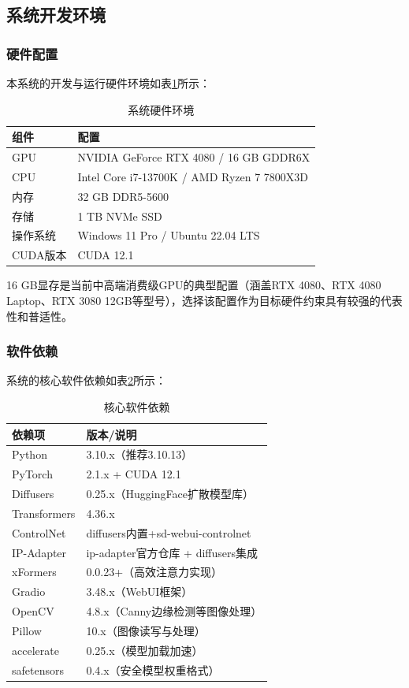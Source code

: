 \documentclass[12pt,a4paper]{ctexart}
\begin{document}
\subsection{系统开发环境}

\subsubsection{硬件配置}

本系统的开发与运行硬件环境如表\ref{tab:hardware}所示：

\begin{table}[H]
\centering
\caption{系统硬件环境}
\label{tab:hardware}
\begin{tabular}{p{4cm} p{8cm}}
\toprule
\textbf{组件} & \textbf{配置} \\
\midrule
GPU & NVIDIA GeForce RTX 4080 / 16 GB GDDR6X \\
CPU & Intel Core i7-13700K / AMD Ryzen 7 7800X3D \\
内存 & 32 GB DDR5-5600 \\
存储 & 1 TB NVMe SSD \\
操作系统 & Windows 11 Pro / Ubuntu 22.04 LTS \\
CUDA版本 & CUDA 12.1 \\
\bottomrule
\end{tabular}
\end{table}

16 GB显存是当前中高端消费级GPU的典型配置（涵盖RTX 4080、RTX 4080 Laptop、RTX 3080 12GB等型号），选择该配置作为目标硬件约束具有较强的代表性和普适性。

\subsubsection{软件依赖}

系统的核心软件依赖如表\ref{tab:software}所示：

\begin{table}[H]
\centering
\caption{核心软件依赖}
\label{tab:software}
\begin{tabular}{p{5cm} p{7cm}}
\toprule
\textbf{依赖项} & \textbf{版本/说明} \\
\midrule
Python & 3.10.x（推荐3.10.13） \\
PyTorch & 2.1.x + CUDA 12.1 \\
Diffusers & 0.25.x（HuggingFace扩散模型库） \\
Transformers & 4.36.x \\
ControlNet & diffusers内置+sd-webui-controlnet \\
IP-Adapter & ip-adapter官方仓库 + diffusers集成 \\
xFormers & 0.0.23+（高效注意力实现） \\
Gradio & 3.48.x（WebUI框架） \\
OpenCV & 4.8.x（Canny边缘检测等图像处理） \\
Pillow & 10.x（图像读写与处理） \\
accelerate & 0.25.x（模型加载加速） \\
safetensors & 0.4.x（安全模型权重格式） \\
\bottomrule
\end{tabular}
\end{table}
\end{document}

